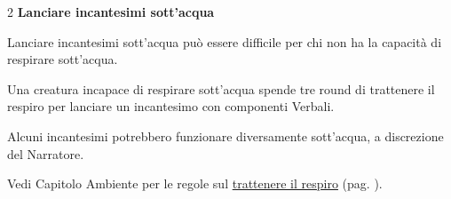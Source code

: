 \begin{multicols}{2}
\textbf{Lanciare incantesimi sott'acqua}

Lanciare incantesimi sott'acqua può essere difficile per chi non ha la capacità di respirare sott'acqua.

Una creatura incapace di respirare sott'acqua spende tre round di trattenere il respiro per lanciare un incantesimo con componenti Verbali.

Alcuni incantesimi potrebbero funzionare diversamente sott'acqua, a discrezione del Narratore.

Vedi Capitolo Ambiente per le regole sul \hyperlink{trattenereilfiato}{trattenere il respiro} (pag. \pageref{trattenereilfiato}).

\end{multicols}

\pagebreak

